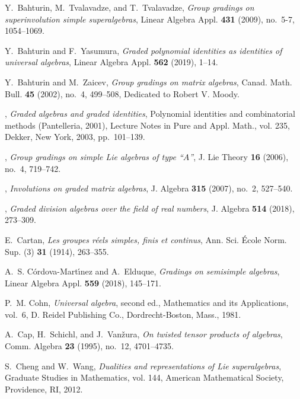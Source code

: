 \documentclass[12pt]{pdfathesis}
\begin{document}
\begin{thebibliography}{BHDSK17}
Y.~Bahturin, M.~Tvalavadze, and T.~Tvalavadze, \emph{Group gradings on
  superinvolution simple superalgebras}, Linear Algebra Appl. \textbf{431}
  (2009), no.~5-7, 1054--1069. 

Y.~Bahturin and F.~Yasumura, \emph{Graded polynomial identities as identities
  of universal algebras}, Linear Algebra Appl. \textbf{562} (2019), 1--14.

Y.~Bahturin and M.~Zaicev, \emph{Group gradings on matrix algebras}, Canad.
  Math. Bull. \textbf{45} (2002), no.~4, 499--508, Dedicated to Robert V.
  Moody. 

\bysame, \emph{Graded algebras and graded identities}, Polynomial identities
  and combinatorial methods ({P}antelleria, 2001), Lecture Notes in Pure and
  Appl. Math., vol. 235, Dekker, New York, 2003, pp.~101--139. 

\bysame, \emph{Group gradings on simple {L}ie algebras of type ``{$A$}''}, J.
  Lie Theory \textbf{16} (2006), no.~4, 719--742. 

\bysame, \emph{Involutions on graded matrix algebras}, J. Algebra \textbf{315}
  (2007), no.~2, 527--540. 

\bysame, \emph{Graded division algebras over the field of real numbers}, J.
  Algebra \textbf{514} (2018), 273--309. 

E.~Cartan, \emph{Les groupes r\'eels simples, finis et continus}, Ann. Sci.
  \'Ecole Norm. Sup. (3) \textbf{31} (1914), 263--355. 

A.~S. C\'{o}rdova-Mart\'{\i}nez and A.~Elduque, \emph{Gradings on semisimple
  algebras}, Linear Algebra Appl. \textbf{559} (2018), 145--171. 

P.~M. Cohn, \emph{Universal algebra}, second ed., Mathematics and its
  Applications, vol.~6, D. Reidel Publishing Co., Dordrecht-Boston, Mass.,
  1981. 

A.~Cap, H.~Schichl, and J.~Van\v{z}ura, \emph{On twisted tensor products of
  algebras}, Comm. Algebra \textbf{23} (1995), no.~12, 4701--4735. 

S.~Cheng and W.~Wang, \emph{Dualities and representations of {L}ie
  superalgebras}, Graduate Studies in Mathematics, vol. 144, American
  Mathematical Society, Providence, RI, 2012. 


\end{thebibliography}
\end{document}
